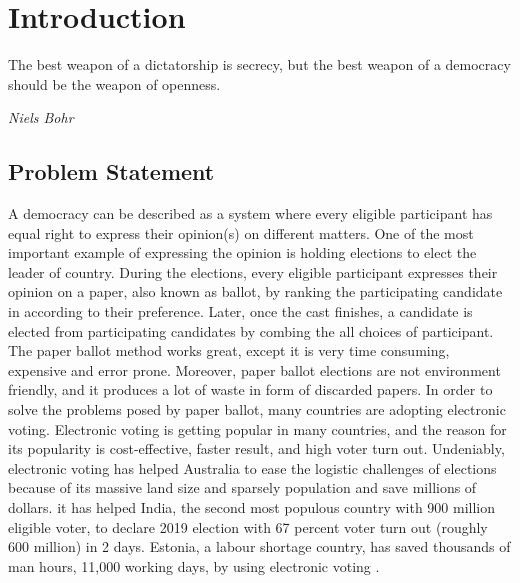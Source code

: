 \chapter{Introduction}
\label{cha:intro}

\epigraph{The best weapon of a dictatorship is secrecy, but the best weapon of a democracy should be the weapon of openness.} 
{\textit{Niels Bohr}} 

\section{Problem Statement}

A democracy can be described as a system where every eligible participant has equal right to express their opinion(s) on different matters. 
One of the most important example of expressing the opinion is holding elections to elect the leader of country. During the 
elections, every eligible participant expresses their opinion on a paper, also known as ballot, by ranking the participating candidate in 
according to their preference. Later, once the cast finishes, a candidate is elected from participating candidates by 
combing the all choices of participant.  The paper ballot method works great, except it is very time consuming, expensive and error prone. 
Moreover, paper ballot elections are not environment friendly, and it produces a lot of waste in form of discarded papers. 
In order to solve the problems posed by paper ballot, many countries are adopting electronic voting. Electronic voting is 
getting popular in many countries, and the reason for its popularity is cost-effective, faster result, and high voter turn out. 
Undeniably, electronic voting has helped Australia to ease the logistic challenges of elections because of its massive land size and sparsely 
population and save millions of dollars.  it has helped India, the second most populous country with 900 million eligible voter, to declare 
2019 election with 67 percent voter turn out (roughly 600 million) in 2 days. Estonia, a labour shortage country, has saved 
thousands of man hours, 11,000 working days, by using electronic voting \citep{Estonia}.

   
